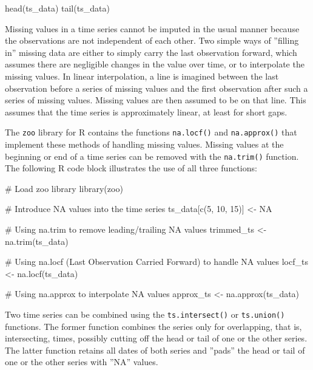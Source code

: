 \begin{samepage}
\begin{Rcode}
head(ts_data)
tail(ts_data)
\end{Rcode}
\end{samepage}

Missing values in a time series cannot be imputed in the usual manner because the observations are not independent of each other. Two simple ways of ''filling in'' missing data are either to simply carry the last observation forward, which assumes there are negligible changes in the value over time, or to interpolate the missing values. In linear interpolation, a line is imagined between the last observation before a series of missing values and the first observation after such a series of missing values. Missing values are then assumed to be on that line. This assumes that the time series is approximately linear, at least for short gaps. 

The \texttt{zoo} library for R contains the functions \texttt{na.locf()} and \texttt{na.approx()} that implement these methods of handling missing values. Missing values at the beginning or end of a time series can be removed with the \texttt{na.trim()} function. The following R code block illustrates the use of all three functions:

\begin{samepage}
\begin{Rcode}
# Load zoo library
library(zoo)

# Introduce NA values into the time series
ts_data[c(5, 10, 15)] <- NA

# Using na.trim to remove leading/trailing NA values
trimmed_ts <- na.trim(ts_data)

# Using na.locf (Last Observation Carried Forward) to handle NA values
locf_ts <- na.locf(ts_data)

# Using na.approx to interpolate NA values
approx_ts <- na.approx(ts_data)
\end{Rcode}
\end{samepage}

Two time series can be combined using the \texttt{ts.intersect()} or \texttt{ts.union()} functions. The former function combines the series only for overlapping, that is, intersecting, times, possibly cutting off the head or tail of one or the other series. The latter function retains all dates of both series and ''pads'' the head or tail of one or the other series with ''NA'' values. 

